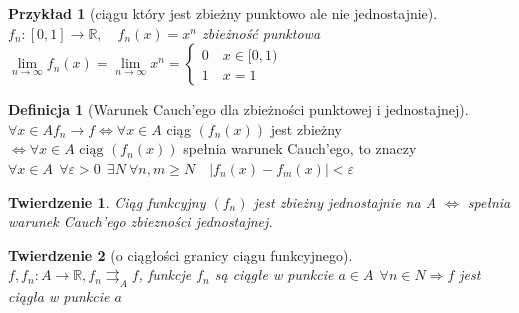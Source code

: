 \documentclass[12pt,a4paper]{article}
\newtheorem{tw}{Twierdzenie}
\newtheorem{przyklad}{Przykład}
\theoremstyle{definition}
\newtheorem{df}{Definicja}
\begin{document}
\begin{przyklad}[ciągu który jest zbieżny punktowo ale nie jednostajnie]
$f_n: [0,1] \to \mathbb{R}, \quad f_n(x) = x^n$ zbieżność punktowa
$
	\lim\limits_{n\to\infty}f_n(x) = \lim\limits_{n\to\infty}x^n = 
	\begin{cases}
	0 \quad x\in[0,1)\\
	1 \quad x=1
	\end{cases}
$
\end{przyklad}

\begin{df}[Warunek Cauch'ego dla zbieżności punktowej i jednostajnej]~\\
$\forall x\in A f_n \rightarrow f \Leftrightarrow \forall x\in A$ ciąg $(f_n(x))$ jest zbieżny $\Leftrightarrow \forall x\in A \text{ ciąg } (f_n(x))$ spełnia warunek Cauch'ego, to znaczy 
$\forall x\in A ~~ \forall \varepsilon>0 ~~ \exists N ~ \forall n,m \geqslant N \quad |f_n(x) - f_m(x)| < \varepsilon$ 
\end{df}

\begin{tw}
Ciąg funkcyjny $(f_n)$ jest zbieżny jednostajnie na A $\Leftrightarrow$ spełnia warunek Cauch'ego zbiezności jednostajnej.
\end{tw}

\begin{tw}[o ciągłości granicy ciągu funkcyjnego]~\\
$f, f_n: A\to \mathbb{R}, f_n \rightrightarrows_A f$, funkcje $f_n$ są ciągłe w punkcie $a\in A ~~ \forall n\in N \Rightarrow f$ jest ciągła w punkcie $a$
\end{tw}
\end{document}
